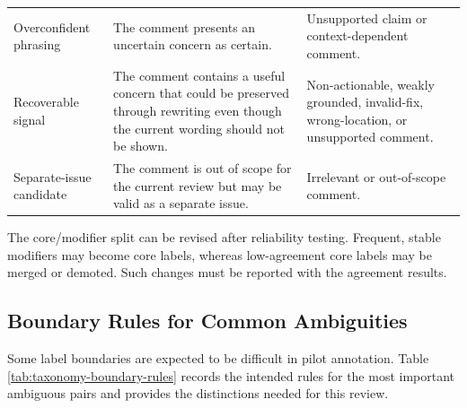 \documentclass[10pt]{article}
\begin{document}
\begin{longtable}{@{}>{\raggedright\arraybackslash}p{}>{\raggedright\arraybackslash}p{}>{\raggedright\arraybackslash}p{}@{}}
Overconfident phrasing & The comment presents an uncertain concern as certain. & Unsupported claim or context-dependent comment. \\
Recoverable signal & The comment contains a useful concern that could be preserved through rewriting even though the current wording should not be shown. & Non-actionable, weakly grounded, invalid-fix, wrong-location, or unsupported comment. \\
Separate-issue candidate & The comment is out of scope for the current review but may be valid as a separate issue. & Irrelevant or out-of-scope comment. \\
\end{longtable}
\endgroup

The core/modifier split can be revised after reliability testing. Frequent, stable modifiers may become core labels, whereas low-agreement core labels may be merged or demoted. Such changes must be reported with the agreement results.

\subsection{Boundary Rules for Common Ambiguities}

Some label boundaries are expected to be difficult in pilot annotation. Table \ref{tab:taxonomy-boundary-rules} records the intended rules for the most important ambiguous pairs and provides the distinctions needed for this review.
\end{document}
